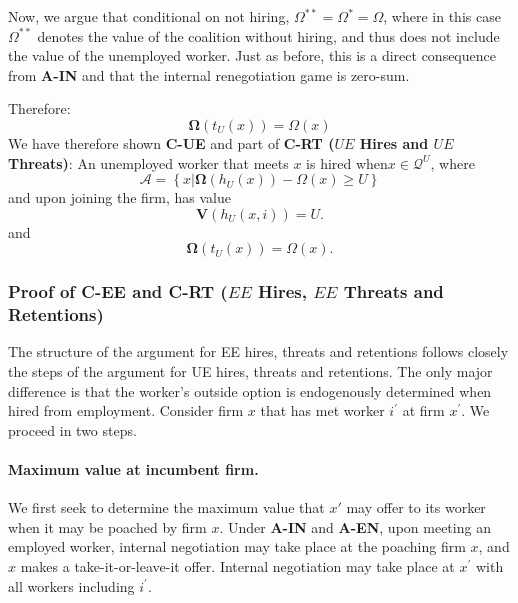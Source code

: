 Now, we argue that conditional on not hiring, $\Omega^{**} = \Omega^* = \Omega$, where in this
case $\Omega^{**}$ denotes the value of the coalition without hiring, and
thus does not include the value of the unemployed worker. Just as before, this is a direct consequence from \textbf{A-IN} and that the internal renegotiation game is zero-sum.

Therefore:
\begin{equation*}
\boldsymbol{\Omega}\left(t_U(x)\right) = \Omega(x)
\end{equation*}
We have therefore shown \textbf{C-UE} and part of \textbf{C-RT ($UE$ Hires
and $UE$ Threats)}: An unemployed worker that meets $x$ is hired when$x\in%
\mathcal{Q}^{U}$, where
\begin{equation*}
\mathcal{A}=\left\{ x\Big|\boldsymbol{\Omega}\left(h_{U}\left(x\right)\right)-%
\Omega\left(x\right)\geq U\right\}
\end{equation*}
and upon joining the firm, has value
\begin{equation*}
\boldsymbol{V}\left(h_{U}\left(x,i\right)\right)=U.
\end{equation*}
and
\begin{equation*}
\boldsymbol{\Omega}(t_U(x)) = \Omega(x).
\end{equation*}


\subsubsection{Proof of C-EE and C-RT ($EE$ Hires, $EE$ Threats and Retentions)}

The structure of the argument for EE hires, threats and retentions follows closely the steps of the argument for UE hires, threats and retentions. The only major difference is that the worker's outside option is endogenously determined when hired from employment. Consider firm $x$ that has met worker $i^{\prime}$ at firm $x^{\prime}$. We proceed in two steps.

\paragraph{Maximum value at incumbent firm.} We first seek to determine the maximum value that $x'$ may offer to its worker when it may be poached by firm $x$. Under \textbf{A-IN} and \textbf{A-EN}, upon meeting an employed worker, internal negotiation
may take place at the poaching firm $x$, and $x$ makes a
take-it-or-leave-it offer. Internal negotiation may take place at $%
x^{\prime}$ with all workers including $i^{\prime}$.

